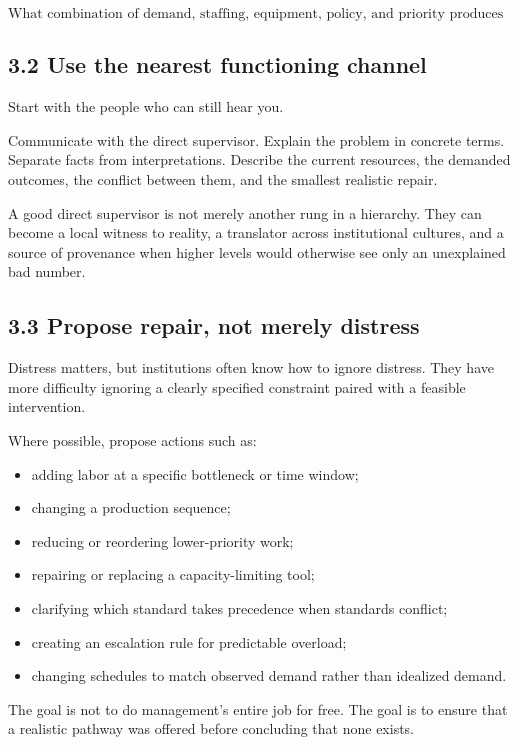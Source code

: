 \documentclass[11pt,oneside]{article}
\providecommand{\tightlist}{%
  \setlength{\itemsep}{0.22em}\setlength{\parskip}{0pt}}
\begin{document}
\[
\text{What combination of demand, staffing, equipment, policy, and priority produces this outcome?}
\]

\subsection{3.2 Use the nearest functioning
channel}\label{use-the-nearest-functioning-channel}

Start with the people who can still hear you.

Communicate with the direct supervisor. Explain the problem in concrete
terms. Separate facts from interpretations. Describe the current
resources, the demanded outcomes, the conflict between them, and the
smallest realistic repair.

A good direct supervisor is not merely another rung in a hierarchy. They
can become a local witness to reality, a translator across institutional
cultures, and a source of provenance when higher levels would otherwise
see only an unexplained bad number.

\subsection{3.3 Propose repair, not merely
distress}\label{propose-repair-not-merely-distress}

Distress matters, but institutions often know how to ignore distress.
They have more difficulty ignoring a clearly specified constraint paired
with a feasible intervention.

Where possible, propose actions such as:

\begin{itemize}
\tightlist
\item
  adding labor at a specific bottleneck or time window;
\item
  changing a production sequence;
\item
  reducing or reordering lower-priority work;
\item
  repairing or replacing a capacity-limiting tool;
\item
  clarifying which standard takes precedence when standards conflict;
\item
  creating an escalation rule for predictable overload;
\item
  changing schedules to match observed demand rather than idealized
  demand.
\end{itemize}

The goal is not to do management's entire job for free. The goal is to
ensure that a realistic pathway was offered before concluding that none
exists.
\end{document}
